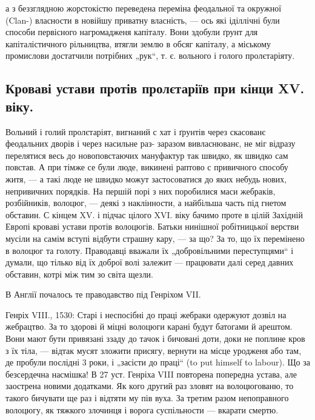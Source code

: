 \parcont{}
а з беззглядною жорстокістю переведена переміна феодальної та окружної (Clan-)
власности в новійшу приватну власність, — ось які іділлічні були способи
первісного нагромадженя капіталу. Вони здобули ґрунт для капіталістичного
рільництва, втягли землю в обсяг капіталу, а міському промислови
достатчили потрібних „рук“, т. є. вольного і голого пролєтаріяту.

\subsection{ Кроваві устави протів пролєтаріїв при кінци XV. віку.}

Вольний і голий пролєтаріят, вигнаний с хат і ґрунтів
через скасованє феодальних дворів і через насильне раз-
заразом вивласнюванє, не міг відразу перелятися весь до
новоповстаючих мануфактур так швидко, як швидко сам
повстав. А при тімже се були люде, викинені раптово с привичного
способу житя, — а такі люде не швидко можут
застосоватися до яких небудь нових, непривичних порядків.
На першій порі з них поробилися маси жебраків, розбійників,
волоцюг, — деякі з наклінности, а найбільша часть під гнетом обставин. С
кінцем XV. і підчас цілого XVI. віку бачимо проте в цілій Західній Европі
кроваві устави протів волоцюгів. Батьки нинішної робітницької верстви мусіли
на самім вступі відбути страшну кару, — за що? За то, що їх перемінено в волоцюг
та голоту. Праводавці вважали їх „добровільними переступцями“ і думали, що
тілько від їх доброї волі залежит — працювати далі серед давних обставин, котрі
між тим зо світа щезли.

В Англії почалось те праводавство під Генріхом VII.

Генріх VIII., 1530: Старі і неспосібні до праці жебраки одержуют дозвіл на
жебрацтво. За то здорові й міцні волоцюги карані будут батогами й арештом. Вони
мают бути привязані ззаду до тачок і бичовані доти, доки не поплине кров з їх
тіла, — відтак мусят зложити присягу, вернути на місце уродженя або там, де
пробули послідні 3 роки, і „засісти до праці“ (to put himself to labour). Що за
безсердечна насмішка! В 27 уст. Генріха VIII повторена попередна устава, але
заострена новими додатками. Як кого другий раз зловят на волоцюгованю, то такого
бичувати ще раз і відтяти му пів вуха. За третим разом непоправного волоцюгу,
як тяжкого злочинця і ворога суспільности — вкарати смертю.

